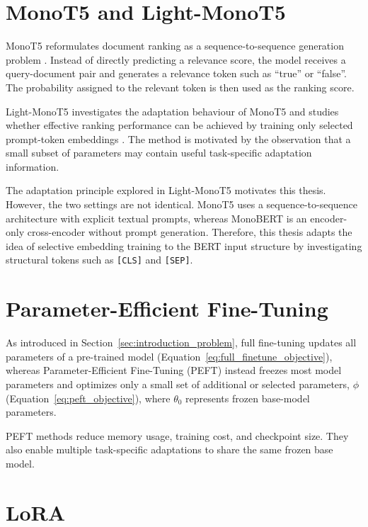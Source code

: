 \section{MonoT5 and Light-MonoT5}
\label{sec:background_monot5}

MonoT5 reformulates document ranking as a sequence-to-sequence generation problem \cite{nogueira2020document}. Instead of directly predicting a relevance score, the model receives a query-document pair and generates a relevance token such as ``true'' or ``false''. The probability assigned to the relevant token is then used as the ranking score.

Light-MonoT5 investigates the adaptation behaviour of MonoT5 and studies whether effective ranking performance can be achieved by training only selected prompt-token embeddings \cite{braga2025monot5}. The method is motivated by the observation that a small subset of parameters may contain useful task-specific adaptation information.

The adaptation principle explored in Light-MonoT5 motivates this thesis. However, the two settings are not identical. MonoT5 uses a sequence-to-sequence architecture with explicit textual prompts, whereas MonoBERT is an encoder-only cross-encoder without prompt generation. Therefore, this thesis adapts the idea of selective embedding training to the BERT input structure by investigating structural tokens such as \texttt{[CLS]} and \texttt{[SEP]}.

\section{Parameter-Efficient Fine-Tuning}
\label{sec:background_peft}

As introduced in Section~\ref{sec:introduction_problem}, full fine-tuning updates all parameters of a pre-trained model (Equation~\ref{eq:full_finetune_objective}), whereas Parameter-Efficient Fine-Tuning (PEFT) instead freezes most model parameters and optimizes only a small set of additional or selected parameters, $\phi$ (Equation~\ref{eq:peft_objective}), where $\theta_0$ represents frozen base-model parameters.

PEFT methods reduce memory usage, training cost, and checkpoint size. They also enable multiple task-specific adaptations to share the same frozen base model.

\section{LoRA}
\label{sec:background_lora}

